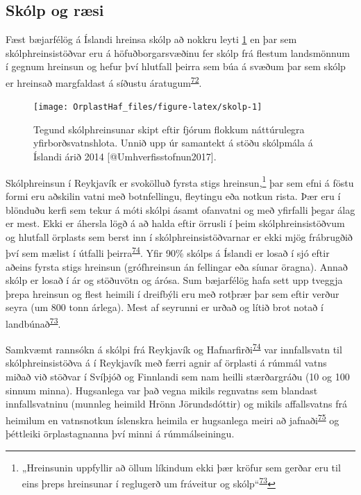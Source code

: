\documentclass[icelandic,]{book}
\let\rmarkdownfootnote\footnote%
\def\footnote{\protect\rmarkdownfootnote}
\begin{document}
\hypertarget{skolp-og-rsi}{%
\subsection*{Skólp og ræsi}\label{skolp-og-rsi}}

Fæst bæjarfélög á Íslandi hreinsa skólp að nokkru leyti \ref{fig:skolp} en þar sem skólphreinsistöðvar eru á höfuðborgarsvæðinu fer skólp frá flestum landsmönnum í gegnum hreinsun og hefur því hlutfall þeirra sem búa á svæðum þar sem skólp er hreinsað margfaldast á síðustu áratugum\textsuperscript{\protect\hyperlink{ref-uxdeoruxf0arson2012}{72}}.

\begin{figure}

{\centering \texttt{[image: OrplastHaf\_files/figure-latex/skolp-1]} 

}

\caption{Tegund skólphreinsunar skipt eftir fjórum flokkum náttúrulegra yfirborðsvatnshlota. Unnið upp úr samantekt á stöðu skólpmála á Íslandi árið 2014 [@Umhverfisstofnun2017].}\label{fig:skolp}
\end{figure}

Skólphreinsun í Reykjavík er svokölluð fyrsta stigs hreinsun,\footnote{„Hreinsunin uppfyllir að öllum líkindum ekki þær kröfur sem gerðar eru til eins þreps hreinsunar í reglugerð um fráveitur og skólp``\textsuperscript{\protect\hyperlink{ref-Umhverfisstofnun2017}{73}}} þar sem efni á föstu formi eru aðskilin vatni með botnfellingu, fleytingu eða notkun rista. Þær eru í blönduðu kerfi sem tekur á móti skólpi ásamt ofanvatni og með yfirfalli þegar álag er mest. Ekki er áhersla lögð á að halda eftir örrusli í þeim skólphreinsistöðvum og hlutfall örplasts sem berst inn í skólphreinsistöðvarnar er ekki mjög frábrugðið því sem mælist í útfalli þeirra\textsuperscript{\protect\hyperlink{ref-magnusson2016microlitter}{74}}. Yfir 90\% skólps á Íslandi er losað í sjó eftir aðeins fyrsta stigs hreinsun (grófhreinsun án fellingar eða síunar öragna). Annað skólp er losað í ár og stöðuvötn og árósa. Sum bæjarfélög hafa sett upp tveggja þrepa hreinsun og flest heimili í dreifbýli eru með rotþrær þar sem eftir verður seyra (um 800 tonn árlega). Mest af seyrunni er urðað og lítið brot notað í landbúnað\textsuperscript{\protect\hyperlink{ref-Umhverfisstofnun2017}{73}}.

Samkvæmt rannsókn á skólpi frá Reykjavík og Hafnarfirði\textsuperscript{\protect\hyperlink{ref-magnusson2016microlitter}{74}} var innfallsvatn til skólphreinsistöðva á í Reykjavík með færri agnir af örplasti á rúmmál vatns miðað við stöðvar í Svíþjóð og Finnlandi sem nam heilli stærðargráðu (10 og 100 sinnum minna). Hugsanlega var það vegna mikils regnvatns sem blandast innfallsvatninu (munnleg heimild Hrönn Jörundsdóttir) og mikils affallsvatns frá heimilum en vatnsnotkun íslenskra heimila er hugsanlega meiri að jafnaði\textsuperscript{\protect\hyperlink{ref-Pakula2010}{75}} og þéttleiki örplastagnanna því minni á rúmmálseiningu.
\end{document}
